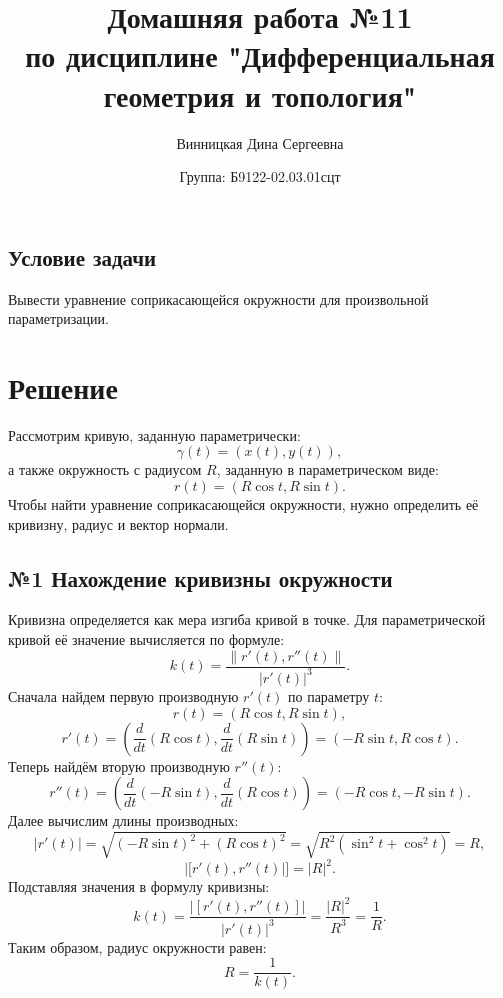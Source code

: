 \documentclass{article}
\title{\vspace{-1cm}Домашняя работа №11 \\ по дисциплине "Дифференциальная геометрия и топология"}
\author{Винницкая Дина Сергеевна}
\date{Группа: Б9122-02.03.01сцт}
\begin{document}
	
	\maketitle


        \subsection*{Условие задачи}
         Вывести уравнение соприкасающейся окружности для произвольной параметризации.
        
        \section*{Решение}
        Рассмотрим кривую, заданную параметрически:
        \[
        \gamma(t) = (x(t), y(t)),
        \]
        а также окружность с радиусом $R$, заданную в параметрическом виде:
        \[
        r(t) = (R \cos t, R \sin t).
        \]
        Чтобы найти уравнение соприкасающейся окружности, нужно определить её кривизну, радиус и вектор нормали.
        
        \subsection*{№1 Нахождение кривизны окружности}
        Кривизна определяется как мера изгиба кривой в точке. Для параметрической кривой её значение вычисляется по формуле:
        \[
        k(t) = \frac{\| r'(t), r''(t) \|}{|r'(t)|^3}.
        \]
        Сначала найдем первую производную $r'(t)$ по параметру $t$:
        \[
        r(t) = (R \cos t, R \sin t),
        \]
        \[
        r'(t) = \left(\frac{d}{dt}(R \cos t), \frac{d}{dt}(R \sin t)\right) = (-R \sin t, R \cos t).
        \]
        Теперь найдём вторую производную $r''(t)$:
        \[
        r''(t) = \left(\frac{d}{dt}(-R \sin t), \frac{d}{dt}(R \cos t)\right) = (-R \cos t, -R \sin t).
        \]
        Далее вычислим длины производных:
        \[
        |r'(t)| = \sqrt{(-R \sin t)^2 + (R \cos t)^2} = \sqrt{R^2 (\sin^2 t + \cos^2 t)} = R,
        \]
        \[
        |[ r'(t), r''(t) |] = |R|^2.
        \]
        Подставляя значения в формулу кривизны:
        \[
        k(t) = \frac{|[ r'(t), r''(t) ]|}{|r'(t)|^3} = \frac{|R|^2}{R^3} = \frac{1}{R}.
        \]
        Таким образом, радиус окружности равен:
        \[
        R = \frac{1}{k(t)}.
        \]
        
\end{document}
